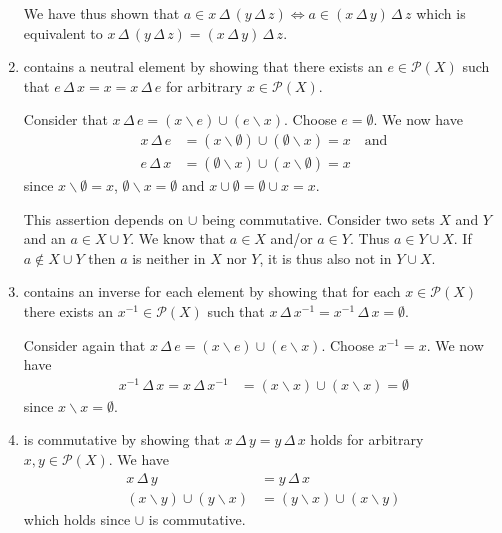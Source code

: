 \documentclass{article}
\newcommand{\Deltaop}{\, \Delta\, }
\begin{document}
\begin{enumerate}
    We have thus shown that $a \in x \Deltaop (y \Deltaop z) \Leftrightarrow a \in (x \Deltaop y) \Deltaop z$ which is equivalent to $x \Deltaop (y \Deltaop z) = (x \Deltaop y) \Deltaop z$.

    \item contains a neutral element by showing that there exists an $e \in \mathcal{P}(X)$ such that $e \Deltaop x = x = x \Deltaop e$ for arbitrary $x \in \mathcal{P}(X)$.
    
    Consider that $x \Deltaop e = (x \backslash e) \cup (e \backslash x)$. Choose $e = \emptyset$. We now have
    \begin{align*}
        x \Deltaop e &= (x \backslash \emptyset) \cup (\emptyset \backslash x) = x \quad \text{and}\\
        e \Deltaop x &= (\emptyset \backslash x) \cup (x \backslash \emptyset) = x
    \end{align*}
    since $x \backslash \emptyset = x$, $\emptyset \backslash x = \emptyset$ and $x \cup \emptyset = \emptyset \cup x = x$.

    This assertion depends on $\cup$ being commutative. Consider two sets $X$ and $Y$ and an $a \in X \cup Y$. We know that $a \in X$ and/or $a \in Y$. Thus $a \in Y \cup X$. If $a \not\in X \cup Y$ then $a$ is neither in $X$ nor $Y$, it is thus also not in $Y \cup X$.

    \item contains an inverse for each element by showing that for each $x \in \mathcal{P}(X)$ there exists an $x^{-1} \in \mathcal{P}(X)$ such that $x \Deltaop x^{-1} = x^{-1} \Deltaop x = \emptyset$.
    
    Consider again that $x \Deltaop e = (x \backslash e) \cup (e \backslash x)$. Choose $x^{-1} = x$. We now have
    \begin{align*}
        x^{-1} \Deltaop x = x \Deltaop x^{-1} &= (x \backslash x) \cup (x \backslash x) = \emptyset
    \end{align*}
    since $x \backslash x = \emptyset$.

    \item is commutative by showing that $x \Deltaop y = y \Deltaop x$ holds for arbitrary $x, y \in \mathcal{P}(X)$. We have
    \begin{align*}
        x \Deltaop y &= y \Deltaop x \\
        (x \backslash y) \cup (y \backslash x) &= (y \backslash x) \cup (x \backslash y)
    \end{align*}
    which holds since $\cup$ is commutative.
\end{enumerate}
\end{document}
